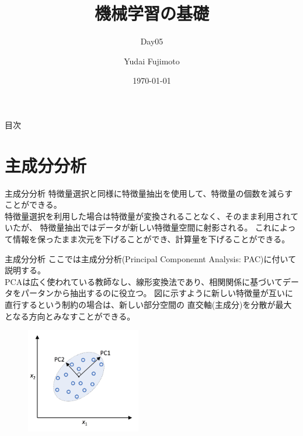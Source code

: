 \documentclass[aspectratio=169, dvipdfmx, 11pt]{beamer} %
\title[Day05]{機械学習の基礎}
\subtitle{Day05}
\author[Yudai Fujimoto]{Yudai Fujimoto}
\institute[SUS]{Suwa University of Science}
\date{\today}
\begin{document}
\maketitle

\begin{frame}{目次}
    \tableofcontents
\end{frame}

\section{主成分分析}
\begin{frame}{主成分分析}
    特徴量選択と同様に特徴量抽出を使用して、特徴量の個数を減らすことができる。\\
    特徴量選択を利用した場合は特徴量が変換されることなく、そのまま利用されていたが、
    特徴量抽出ではデータが新しい特徴量空間に射影される。
    これによって情報を保ったまま次元を下げることができ、計算量を下げることができる。
\end{frame}

\begin{frame}{主成分分析}
    ここでは主成分分析(Principal Componennt Analysis: PAC)に付いて説明する。 \\
    PCAは広く使われている教師なし、線形変換法であり、相関関係に基づいてデータをパータンから抽出するのに役立つ。
    図に示すように新しい特徴量が互いに直行するという制約の場合は、新しい部分空間の
    直交軸(主成分)を分散が最大となる方向とみなすことができる。
    \vspace{1em}
    \begin{figure}[b]
        \begin{center}
        \includegraphics[width=50mm]{img/day05/fig01.png}
        \end{center}
    \end{figure}
\end{frame}
\end{document}
